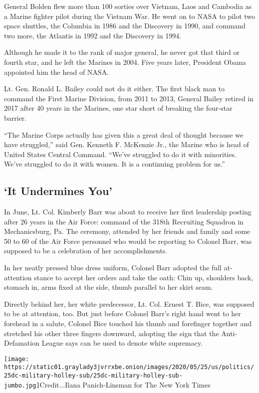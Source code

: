 General Bolden flew more than 100 sorties over Vietnam, Laos and
Cambodia as a Marine fighter pilot during the Vietnam War. He went on to
NASA to pilot two space shuttles, the Columbia in 1986 and the Discovery
in 1990, and command two more, the Atlantis in 1992 and the Discovery in
1994.

Although he made it to the rank of major general, he never got that
third or fourth star, and he left the Marines in 2004. Five years later,
President Obama appointed him the head of NASA.

Lt. Gen. Ronald L. Bailey could not do it either. The first black man to
command the First Marine Division, from 2011 to 2013, General Bailey
retired in 2017 after 40 years in the Marines, one star short of
breaking the four-star barrier.

``The Marine Corps actually has given this a great deal of thought
because we have struggled,'' said Gen. Kenneth F. McKenzie Jr., the
Marine who is head of United States Central Command. ``We've struggled
to do it with minorities. We've struggled to do it with women. It is a
continuing problem for us.''

\hypertarget{it-undermines-you}{%
\subsection{`It Undermines You'}\label{it-undermines-you}}

In June, Lt. Col. Kimberly Barr was about to receive her first
leadership posting after 26 years in the Air Force: command of the 318th
Recruiting Squadron in Mechanicsburg, Pa. The ceremony, attended by her
friends and family and some 50 to 60 of the Air Force personnel who
would be reporting to Colonel Barr, was supposed to be a celebration of
her accomplishments.

In her neatly pressed blue dress uniform, Colonel Barr adopted the full
at-attention stance to accept her orders and take the oath: Chin up,
shoulders back, stomach in, arms fixed at the side, thumb parallel to
her skirt seam.

Directly behind her, her white predecessor, Lt. Col. Ernest T. Bice, was
supposed to be at attention, too. But just before Colonel Barr's right
hand went to her forehead in a salute, Colonel Bice touched his thumb
and forefinger together and stretched his other three fingers downward,
adopting the sign that the Anti-Defamation League says can be used to
denote white supremacy.

\texttt{[image: https://static01.graylady3jvrrxbe.onion/images/2020/05/25/us/politics/25dc-military-holley-sub/25dc-military-holley-sub-jumbo.jpg]}Credit...Ilana
Panich-Linsman for The New York Times

